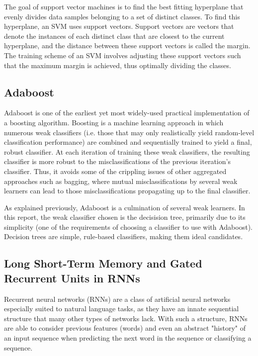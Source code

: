 \documentclass[11pt,a4paper]{article}
\begin{document}
The goal of support vector machines is to find the best fitting hyperplane that evenly divides data samples belonging to a set of distinct classes. To find this hyperplane, an SVM uses support vectors. Support vectors are vectors that denote the instances of each distinct class that are closest to the current hyperplane, and the distance between these support vectors is called the margin. The training scheme of an SVM involves adjusting these support vectors such that the maximum margin is achieved, thus optimally dividing the classes.

\subsection{Adaboost} 

Adaboost \cite{adaboost} is one of the earliest yet most widely-used practical implementation of a boosting algorithm. Boosting is a machine learning approach in which numerous weak classifiers (i.e. those that may only realistically yield random-level classification performance) are combined and sequentially trained to yield a final, robust classifier. At each iteration of training these weak classifiers, the resulting classifier is more robust to the misclassifications of the previous iteration's classifier. Thus, it avoids some of the crippling issues of other aggregated approaches such as bagging, where mutual misclassifications by several weak learners can lead to those misclassifications propagating up to the final classifier.

As explained previously, Adaboost is a culmination of several weak learners. In this report, the weak classifier chosen is the decisision tree, primarily due to its simplicity (one of the requirements of choosing a classifier to use with Adaboost). Decision trees are simple, rule-based classifiers, making them ideal candidates.

\subsection{Long Short-Term Memory and Gated Recurrent Units in RNNs}

Recurrent neural networks (RNNs) are a class of artificial neural networks especially suited to natural language tasks, as they have an innate sequential structure that many other types of networks lack. With such a structure, RNNs are able to consider previous features (words) and even an abstract "history" of an input sequence when predicting the next word in the sequence or classifying a sequence.
\end{document}
